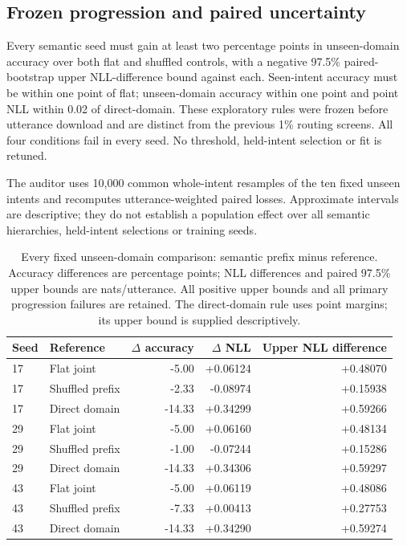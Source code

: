 \documentclass[11pt]{article}
\begin{document}
\subsection{Frozen progression and paired uncertainty}

Every semantic seed must gain at least two percentage points in unseen-domain
accuracy over both flat and shuffled controls, with a negative 97.5\%
paired-bootstrap upper NLL-difference bound against each. Seen-intent
accuracy must be within one point of flat; unseen-domain accuracy within
one point and point NLL within 0.02 of direct-domain. These exploratory
rules were frozen before utterance download and are distinct from the
previous 1\% routing screens. All four conditions fail in every seed.
No threshold, held-intent selection or fit is retuned.

The auditor uses 10,000 common whole-intent resamples of the ten fixed unseen
intents and recomputes utterance-weighted paired losses. Approximate intervals
are descriptive; they do not establish a population effect over all semantic
hierarchies, held-intent selections or training seeds.

\begin{table}[htbp]
\centering\small
\caption{Every fixed unseen-domain comparison: semantic prefix minus reference.
Accuracy differences are percentage points; NLL differences and paired 97.5\%
upper bounds are nats/utterance. All positive upper bounds and all primary
progression failures are retained. The direct-domain rule uses point margins;
its upper bound is supplied descriptively.}
\label{tab:semantic-paired}
\begin{tabular}{llrrr}
\toprule
Seed & Reference & $\Delta$ accuracy & $\Delta$ NLL & Upper NLL difference\\
\midrule
17 & Flat joint & -5.00 & +0.06124 & +0.48070\\
17 & Shuffled prefix & -2.33 & -0.08974 & +0.15938\\
17 & Direct domain & -14.33 & +0.34299 & +0.59266\\
29 & Flat joint & -5.00 & +0.06160 & +0.48134\\
29 & Shuffled prefix & -1.00 & -0.07244 & +0.15286\\
29 & Direct domain & -14.33 & +0.34306 & +0.59297\\
43 & Flat joint & -5.00 & +0.06119 & +0.48086\\
43 & Shuffled prefix & -7.33 & +0.00413 & +0.27753\\
43 & Direct domain & -14.33 & +0.34290 & +0.59274\\
\bottomrule
\end{tabular}
\end{table}
\end{document}

